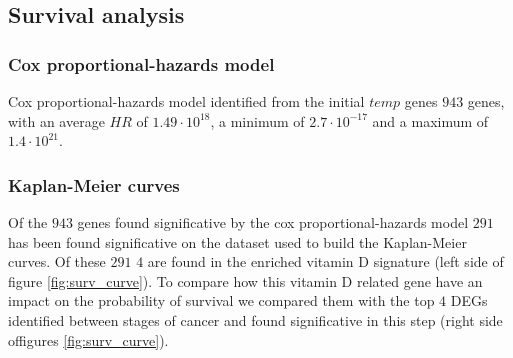 \documentclass[fleqn,10pt]{SelfArx} %
\begin{document}
	\subsection{Survival analysis}

		\subsubsection{Cox proportional-hazards model}
		Cox proportional-hazards model identified from the initial $temp$ genes $943$ genes, with an average $HR$ of $1.49\cdot 10^{18}$, a minimum of $2.7\cdot 10^{-17}$ and a maximum of $1.4\cdot 10^{21}$.

		\subsubsection{Kaplan-Meier curves}
		Of the $943$ genes found significative by the cox proportional-hazards model $291$ has been found significative on the dataset used to build the Kaplan-Meier curves.
		Of these $291$ $4$ are found in the enriched vitamin D signature (left side of figure \ref{fig:surv_curve}).
		To compare how this vitamin D related gene have an impact on the probability of survival we compared them with the top $4$ DEGs identified between stages of cancer and found significative in this step (right side offigures \ref{fig:surv_curve}).
\end{document}
